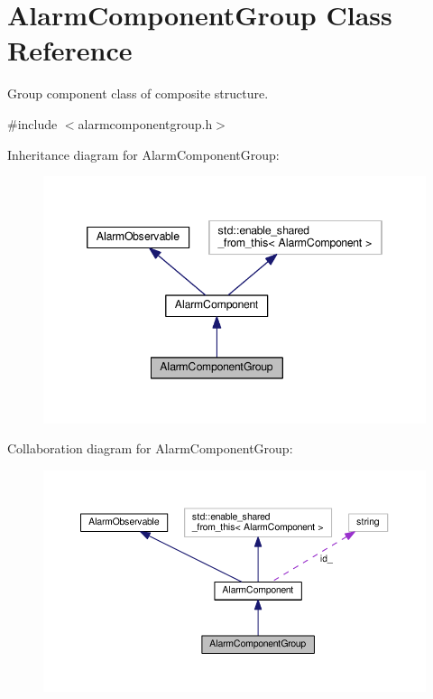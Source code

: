 \hypertarget{classAlarmComponentGroup}{}\section{Alarm\+Component\+Group Class Reference}
\label{classAlarmComponentGroup}


Group component class of composite structure.  




{\ttfamily \#include $<$alarmcomponentgroup.\+h$>$}



Inheritance diagram for Alarm\+Component\+Group\+:\nopagebreak
\begin{figure}[H]
\begin{center}
\leavevmode
\includegraphics[width=346pt]{classAlarmComponentGroup__inherit__graph}
\end{center}
\end{figure}


Collaboration diagram for Alarm\+Component\+Group\+:\nopagebreak
\begin{figure}[H]
\begin{center}
\leavevmode
\includegraphics[width=350pt]{classAlarmComponentGroup__coll__graph}
\end{center}
\end{figure}
